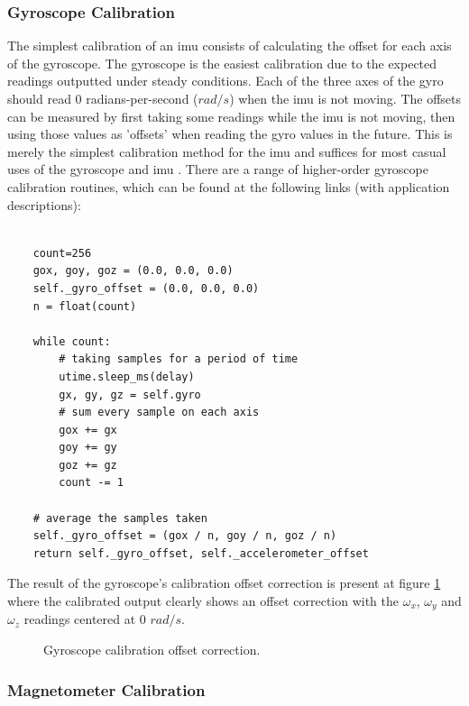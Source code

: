 \subsubsection{Gyroscope Calibration}

The simplest calibration of an \acrshort{imu} consists of calculating the offset for each axis of the gyroscope. The gyroscope is the easiest calibration due to the expected readings outputted under steady conditions. Each of the three axes of the gyro should read 0 radians-per-second ($rad/s$) when the \acrshort{imu} is not moving. The offsets can be measured by first taking some readings while the \acrshort{imu} is not moving, then using those values as 'offsets' when reading the gyro values in the future. This is merely the simplest calibration method for the \acrshort{imu} and suffices for most casual uses of the gyroscope and \acrshort{imu} \cite{olivares2009high}. There are a range of  higher-order gyroscope calibration routines, which can be found at the following links (with application descriptions):

\lstset{language=Python}

\begin{lstlisting}[frame=single]  % Start your code-block

    count=256
    gox, goy, goz = (0.0, 0.0, 0.0)
    self._gyro_offset = (0.0, 0.0, 0.0) 
    n = float(count)

    while count:
        # taking samples for a period of time
        utime.sleep_ms(delay)
        gx, gy, gz = self.gyro
        # sum every sample on each axis
        gox += gx
        goy += gy
        goz += gz
        count -= 1

    # average the samples taken
    self._gyro_offset = (gox / n, goy / n, goz / n)
    return self._gyro_offset, self._accelerometer_offset
\end{lstlisting}

The result of the gyroscope's calibration offset correction is present at figure \ref{fig:gyroscope_calibration} where the calibrated output clearly shows an offset correction with the $\omega_x$, $\omega_y$  and $\omega_z$ readings centered at 0 $rad/s$.

\begin{figure}[!h]
    \centering
    \resizebox{0.8\linewidth}{!}{}
    \caption{Gyroscope calibration offset correction.}
    \label{fig:gyroscope_calibration}
\end{figure}

\subsubsection{Magnetometer Calibration}

